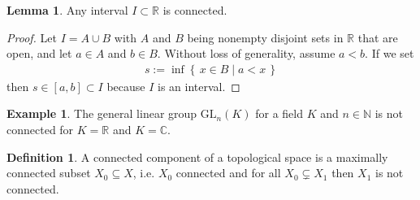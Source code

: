 \documentclass[a4paper]{book}
\theoremstyle{definition}
\newtheorem{definition}{Definition}[chapter]
\newtheorem{example}{Example}[definition]
\newtheorem{lemma}{Lemma}[definition]
\newcommand{\makeset}[2]{\left\{\, #1 \mid #2 \,\right\}}
\begin{document}
    \begin{lemma}
        Any {\color{mathif}interval} \(I \subset \mathbb{R}\) is {\color{maththen}connected}.
    \end{lemma}

    \begin{proof}
        Let \(I = A \cup B\) with \(A\) and \(B\) being nonempty disjoint sets in \(\mathbb{R}\) that are open, and let \(a \in A\) and \(b \in B\). Without loss of generality, assume \(a < b\). If we set
        \begin{align}
            s := \inf \makeset{x \in B}{a < x}
        \end{align}
        then \(s \in [a, b] \subset I\) because \(I\) is an interval. %
    \end{proof}

    \begin{example}
        The general linear group \(\mathrm{GL}_n(K)\) for a field \(K\) and \(n \in \mathbb{N}\) is not connected for \(K = \mathbb{R}\) and \(K = \mathbb{C}\).
    \end{example}

    \begin{defbox}
        \begin{definition}
            A connected component of a topological space is a maximally connected subset \(X_0 \subseteq X\), i.e. \(X_0\) connected and for all \(X_0 \subsetneq X_1\) then \(X_1\) is not connected.
        \end{definition}
    \end{defbox}
\end{document}
